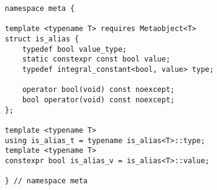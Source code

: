 
\begin{verbatim}
namespace meta {

template <typename T> requires Metaobject<T>
struct is_alias {
	typedef bool value_type;
	static constexpr const bool value;
	typedef integral_constant<bool, value> type;

	operator bool(void) const noexcept;
	bool operator(void) const noexcept;
};

template <typename T>
using is_alias_t = typename is_alias<T>::type;
template <typename T>
constexpr bool is_alias_v = is_alias<T>::value;

} // namespace meta
\end{verbatim}
